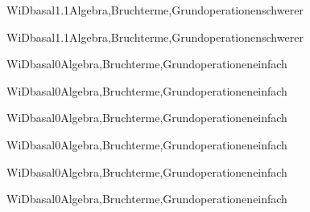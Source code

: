 \documentclass[12pt]{article}
\begin{document}
    \begin{Add}{WiD}{basal1.1}{Algebra,Bruchterme,Grundoperationen}{schwerer}
    \solution{ }
    \end{Add}
    \begin{Add}{WiD}{basal1.1}{Algebra,Bruchterme,Grundoperationen}{schwerer}
    \end{Add}
    

    \begin{Add}{WiD}{basal0}{Algebra,Bruchterme,Grundoperationen}{einfach}
    \solution{ }
    \end{Add}
    \begin{Add}{WiD}{basal0}{Algebra,Bruchterme,Grundoperationen}{einfach}
    \end{Add}
    

    \begin{Add}{WiD}{basal0}{Algebra,Bruchterme,Grundoperationen}{einfach}
    \solution{ }
    \end{Add}
    \begin{Add}{WiD}{basal0}{Algebra,Bruchterme,Grundoperationen}{einfach}
    \end{Add}
    

    \begin{Add}{WiD}{basal0}{Algebra,Bruchterme,Grundoperationen}{einfach}
    \solution{ }
    \end{Add}
    \begin{Add}{WiD}{basal0}{Algebra,Bruchterme,Grundoperationen}{einfach}
    \end{Add}
    
\end{document}
